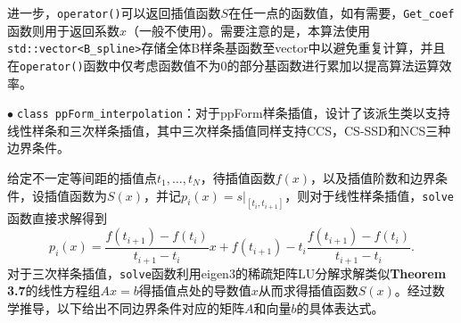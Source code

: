 \documentclass{ctexart}
\begin{document}
\begin{sloppypar}
进一步，\verb|operator()|可以返回插值函数$S$在任一点的函数值，如有需要，\verb|Get_coef|函数则用于返回系数$x$（一般不使用）。需要注意的是，本算法使用\verb|std::vector<B_spline>|存储全体B样条基函数至vector中以避免重复计算，并且在\verb|operator()|函数中仅考虑函数值不为0的部分基函数进行累加以提高算法运算效率。

$\bullet \;$\verb|class ppForm_interpolation|：对于ppForm样条插值，设计了该派生类以支持线性样条和三次样条插值，其中三次样条插值同样支持CCS，CS-SSD和NCS三种边界条件。

给定不一定等间距的插值点$t_1,\dots,t_N$，待插值函数$f(x)$，以及插值阶数和边界条件，设插值函数为$S(x)$，并记$p_i(x)=s|_{[t_i,t_{i+1}]}$，则对于线性样条插值，\verb|solve|函数直接求解得到
\begin{equation}
    p_i(x)=\frac{f(t_{i+1})-f(t_i)}{t_{i+1}-t_i}x + f(t_{i+1})-t_i\frac{f(t_{i+1})-f(t_i)}{t_{i+1}-t_i}.
\end{equation}
对于三次样条插值，\verb|solve|函数利用eigen3的稀疏矩阵LU分解求解类似\textbf{Theorem 3.7}的线性方程组$Ax = b$得插值点处的导数值$x$从而求得插值函数$S(x)$。经过数学推导，以下给出不同边界条件对应的矩阵$A$和向量$b$的具体表达式。


\end{sloppypar}
\end{document}
